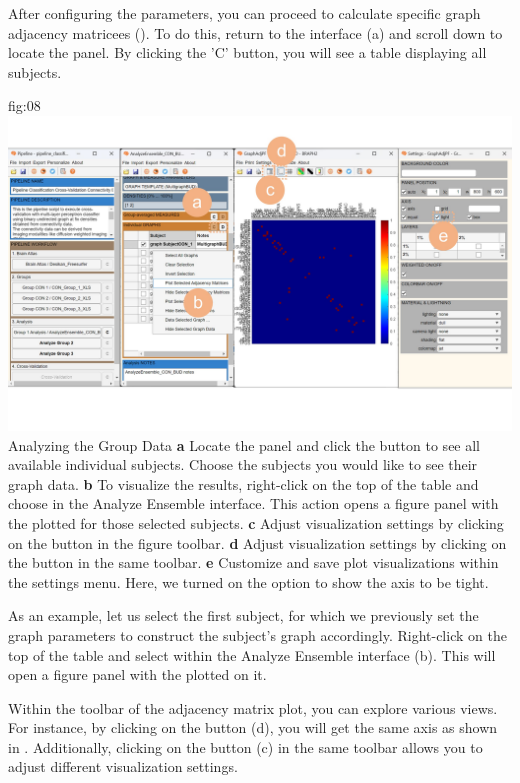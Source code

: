 \documentclass[justified]{tufte-handout}
\begin{document}
{After configuring the parameters, you can proceed to calculate specific graph adjacency matricees (). To do this, return to the  interface (a) and scroll down to locate the  panel. By clicking the 'C' button, you will see a table displaying all subjects.

	{fig:08}
	{
	\includegraphics{fig08.jpg}
	}
	{Analyzing the Group Data}
	{
	{\bf a} Locate the  panel and click the  button to see all available individual subjects. Choose the subjects you would like to see their graph data.
	{\bf b} To visualize the results, right-click on the top of the table and choose  in the Analyze Ensemble interface. This action opens a figure panel with the  plotted for those selected subjects.
	{\bf c} Adjust visualization settings by clicking on the  button in the figure toolbar.
	{\bf d} Adjust visualization settings by clicking on the  button in the same toolbar.
	{\bf e} Customize and save plot visualizations within the settings menu. Here, we turned on the option to show the axis to be tight.
	}

As an example, let us select the first subject, for which we previously set the graph parameters to construct the subject's graph accordingly. 
Right-click on the top of the table and select  within the Analyze Ensemble interface (b). This will open a figure panel with the  plotted on it.

Within the toolbar of the adjacency matrix plot, you can explore various views.
For instance, by clicking on the  button (d), you will get the same axis as shown in . Additionally, clicking on the  button (c) in the same toolbar allows you to adjust different visualization settings.

}
\end{document}
